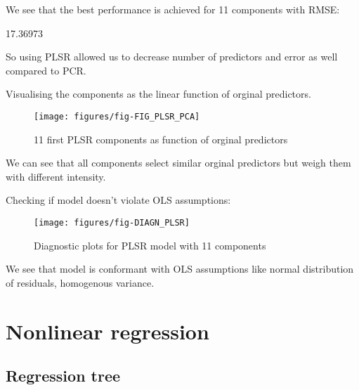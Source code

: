 \documentclass[a4paper]{article}
\begin{document}
We see that the best performance is achieved for 11 components with RMSE: 
\begin{Schunk}
\begin{Soutput}
[1] 17.36973
\end{Soutput}
\end{Schunk}
So using PLSR allowed us to decrease number of predictors and error as well
compared to PCR.

Visualising the components as the linear function of orginal predictors.
\begin{figure}[H]
\begin{center}
\texttt{[image: figures/fig-FIG\_PLSR\_PCA]}
\caption{11 first PLSR components as function of orginal predictors}
\end{center}
\end{figure}
We can see that all components select similar orginal predictors but weigh them
with different intensity.

Checking if model doesn't violate OLS assumptions:
\begin{figure}[H]
\begin{center}
\texttt{[image: figures/fig-DIAGN\_PLSR]}
\caption{Diagnostic plots for PLSR model with 11 components}
\end{center}
\end{figure}
We see that model is conformant with OLS assumptions like normal distribution of
residuals, homogenous variance.

\section{Nonlinear regression}

\subsection{Regression tree}
\end{document}
